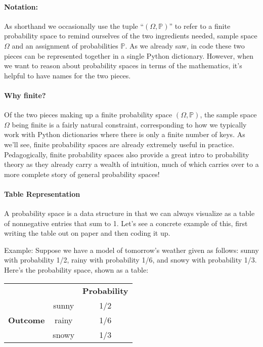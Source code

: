 \documentclass[6008notes.tex]{subfiles}
\begin{document}
 
\paragraph{Notation:} As shorthand we occasionally use the tuple ``$(\Omega ,\mathbb {P})$'' to refer to a finite probability space to remind ourselves of the two ingredients needed, sample space $\Omega$ and an assignment of probabilities $\mathbb {P}$. As we already saw, in code these two pieces can be represented together in a single Python dictionary. However, when we want to reason about probability spaces in terms of the mathematics, it's helpful to have names for the two pieces.

\paragraph{Why finite?} Of the two pieces making up a finite probability space $(\Omega ,\mathbb {P})$, the sample space $\Omega$ being finite is a fairly natural constraint, corresponding to how we typically work with Python dictionaries where there is only a finite number of keys. As we'll see, finite probability spaces are already extremely useful in practice. Pedagogically, finite probability spaces also provide a great intro to probability theory as they already carry a wealth of intuition, much of which carries over to a more complete story of general probability spaces!

\paragraph{Table Representation}

A probability space is a data structure in that we can always visualize as a table of nonnegative entries that sum to 1. Let's see a concrete example of this, first writing the table out on paper and then coding it up.

Example: Suppose we have a model of tomorrow's weather given as follows: sunny with probability 1/2, rainy with probability 1/6, and snowy with probability 1/3. Here's the probability space, shown as a table:

\begin{center}
\begin{tabular}{c c c}
 & & \textbf{Probability} \\
 &	sunny	& 1/2 \\
\textbf{Outcome} &	rainy &	1/6 \\
 &	snowy	& 1/3
\end{tabular}
\end{center}
\end{document}
